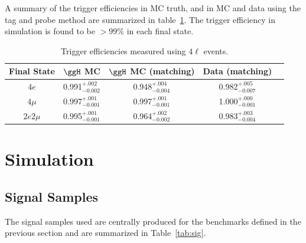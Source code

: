 A summary of the trigger efficiencies in MC truth, and in MC and data using the tag and probe method are summarized in table~\ref{tab:TrigEff}. The trigger
efficiency in simulation is found to be $>99\%$ in each final state.

\begin{table}[h]
    \centering
    \begin{tabular}{|c|c|c|c|c|} 
\hline %
Final State  & $\ggH$ MC & $\ggH$ MC (matching)  & Data (matching)   \\
\hline %
$4e$  & 0.991$^{+.002}_{-0.002}$ & 0.948$^{+.004}_{-0.004}$ & 0.982$^{+.005}_{-0.007}$ \\
$4\mu$  & 0.997$^{+.001}_{-0.001}$ & 0.997$^{+.001}_{-0.001}$ & 1.000$^{+.000}_{-0.001}$ \\
$2e2\mu$  & 0.995$^{+.001}_{-0.001}$ & 0.964$^{+.002}_{-0.002}$ & 0.983$^{+.003}_{-0.004}$ \\
\hline %
    \end{tabular}
    \caption{Trigger efficiencies measured using $4\ell$ events.}
    \label{tab:TrigEff}
\end{table}

\section{Simulation}

\subsection{Signal Samples}

The signal samples used are centrally produced for the benchmarks defined in the previous section and are summarized in Table~\ref{tab:sig}.

\begin{table}
\caption{Benchmark signal samples analyzed.}\label{tab:sig}
\end{table}


